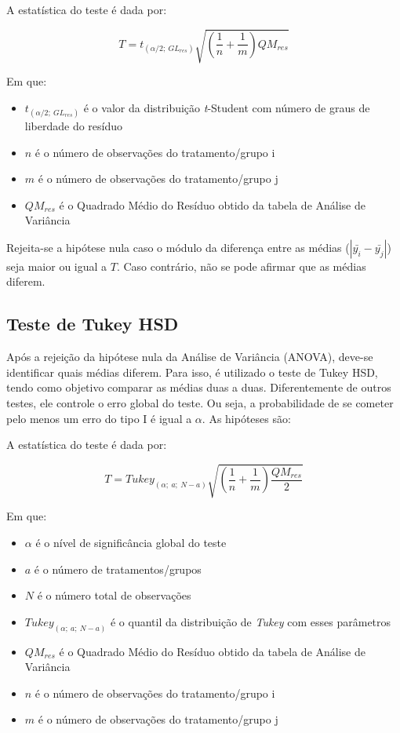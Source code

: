 \documentclass[
]{estat/estat}
\providecommand{\tightlist}{%
  \setlength{\itemsep}{0pt}\setlength{\parskip}{0pt}}\usepackage{longtable,booktabs,array}
\begin{document}

A estatística do teste é dada por:

\[T = t_{(\alpha/2; \: GL_{res})}\sqrt{\left(\frac{1}{n}+\frac{1}{m}\right)QM_{res}}\]

Em que:

\begin{itemize}
\item
  \(t_{(\alpha/2; \: GL_{res})}\) é o valor da distribuição
  \textit{t}-Student com número de graus de liberdade do resíduo
\item
  \(n\) é o número de observações do tratamento/grupo i
\item
  \(m\) é o número de observações do tratamento/grupo j
\item
  \(QM_{res}\) é o Quadrado Médio do Resíduo obtido da tabela de Análise
  de Variância
\end{itemize}

Rejeita-se a hipótese nula caso o módulo da diferença entre as médias
(\(|\bar{y_i} - \bar{y_j}|\)) seja maior ou igual a \(T\). Caso
contrário, não se pode afirmar que as médias diferem.

\hypertarget{teste-de-tukey-hsd}{%
\subsection{Teste de Tukey HSD}\label{teste-de-tukey-hsd}}

Após a rejeição da hipótese nula da Análise de Variância (ANOVA),
deve-se identificar quais médias diferem. Para isso, é utilizado o teste
de Tukey HSD, tendo como objetivo comparar as médias duas a duas.
Diferentemente de outros testes, ele controle o erro global do teste. Ou
seja, a probabilidade de se cometer pelo menos um erro do tipo I é igual
a \(\alpha\). As hipóteses são:


A estatística do teste é dada por:

\[T = Tukey_{(\alpha; \: a; \: N-a)}\sqrt{\left(\frac{1}{n}+\frac{1}{m}\right)\frac{QM_{res}}{2}}\]

Em que:

\begin{itemize}
\tightlist
\item
  \(\alpha\) é o nível de significância global do teste
\item
  \(a\) é o número de tratamentos/grupos
\item
  \(N\) é o número total de observações
\item
  \(Tukey_{(\alpha; \: a; \: N-a)}\) é o quantil da distribuição de
  \textit{Tukey} com esses parâmetros
\item
  \(QM_{res}\) é o Quadrado Médio do Resíduo obtido da tabela de Análise
  de Variância
\item
  \(n\) é o número de observações do tratamento/grupo i
\item
  \(m\) é o número de observações do tratamento/grupo j
\end{itemize}
\end{document}
